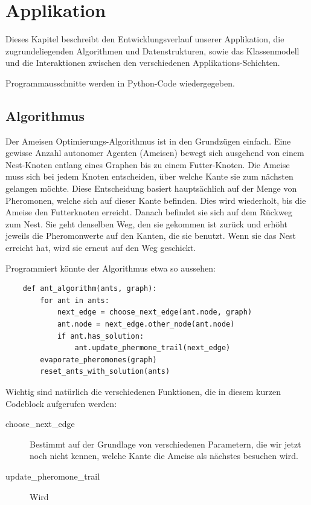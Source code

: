 
\chapter{Applikation}

Dieses Kapitel beschreibt den Entwicklungsverlauf unserer Applikation, die zugrundeliegenden Algorithmen und Datenstrukturen, sowie das Klassenmodell und die Interaktionen zwischen den verschiedenen Applikations-Schichten.

Programmausschnitte werden  in Python-Code wiedergegeben.

\section{Algorithmus}

Der Ameisen Optimierungs-Algorithmus ist in den Grundzügen einfach. Eine gewisse Anzahl autonomer Agenten (Ameisen) bewegt sich ausgehend von einem Nest-Knoten entlang eines Graphen bis zu einem Futter-Knoten. Die Ameise muss sich bei jedem Knoten entscheiden, über welche Kante sie zum nächsten gelangen möchte. Diese Entscheidung basiert hauptsächlich auf der Menge von Pheromonen, welche sich auf dieser Kante befinden. Dies wird wiederholt, bis die Ameise den Futterknoten erreicht. Danach befindet sie sich auf dem Rückweg zum Nest. Sie geht denselben Weg, den sie gekommen ist zurück und erhöht jeweils die Pheromonwerte auf den Kanten, die sie benutzt. Wenn sie das Nest erreicht hat, wird sie erneut auf den Weg geschickt.

Programmiert könnte der Algorithmus etwa so aussehen:

\begin{lstlisting}
	def ant_algorithm(ants, graph):
		for ant in ants:
			next_edge = choose_next_edge(ant.node, graph)
			ant.node = next_edge.other_node(ant.node)
			if ant.has_solution:
				ant.update_phermone_trail(next_edge)	
		evaporate_pheromones(graph)
		reset_ants_with_solution(ants)
\end{lstlisting}

Wichtig sind natürlich die verschiedenen Funktionen, die in diesem kurzen Codeblock aufgerufen werden:

\begin{description}
\item[choose\_next\_edge] Bestimmt auf der Grundlage von verschiedenen Parametern, die wir jetzt noch nicht kennen, welche Kante die Ameise als nächstes besuchen wird.
\item[update\_pheromone\_trail] Wird 
\end{description}

